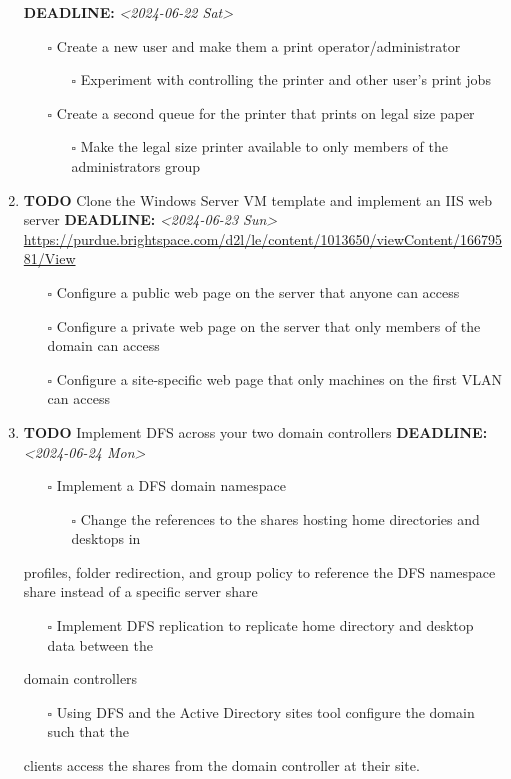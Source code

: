 \documentclass[letterpaper]{article}
\begin{document}
\begin{enumerate}
\label{sec:org3d6a4d6}
\noindent\textbf{DEADLINE:} \textit{<2024-06-22 Sat>}\\[0pt]
\begin{itemize}
\item[{$\square$}] Create a new user and make them a print operator/administrator
\begin{itemize}
\item[{$\square$}] Experiment with controlling the printer and other user’s print jobs
\end{itemize}
\item[{$\square$}] Create a second queue for the printer that prints on legal size paper
\begin{itemize}
\item[{$\square$}] Make the legal size printer available to only members of the administrators group
\end{itemize}
\end{itemize}
\item {\bfseries\sffamily TODO} Clone the Windows Server VM template and implement an IIS web server
\label{sec:org57fe000}
\noindent\textbf{DEADLINE:} \textit{<2024-06-23 Sun>}\\[0pt]
\url{https://purdue.brightspace.com/d2l/le/content/1013650/viewContent/16679581/View}
\begin{itemize}
\item[{$\square$}] Configure a public web page on the server that anyone can access
\item[{$\square$}] Configure a private web page on the server that only members of the domain can access
\item[{$\square$}] Configure a site-specific web page that only machines on the first VLAN can access
\end{itemize}
\item {\bfseries\sffamily TODO} Implement DFS across your two domain controllers
\label{sec:org5ec5bc6}
\noindent\textbf{DEADLINE:} \textit{<2024-06-24 Mon>}\\[0pt]
\begin{itemize}
\item[{$\square$}] Implement a DFS domain namespace
\begin{itemize}
\item[{$\square$}] Change the references to the shares hosting home directories and desktops in
\end{itemize}
\end{itemize}
profiles, folder redirection, and group policy to reference the DFS namespace
share instead of a specific server share
\begin{itemize}
\item[{$\square$}] Implement DFS replication to replicate home directory and desktop data between the
\end{itemize}
domain controllers
\begin{itemize}
\item[{$\square$}] Using DFS and the Active Directory sites tool configure the domain such that the
\end{itemize}
clients access the shares from the domain controller at their site.
\end{enumerate}
\end{document}
